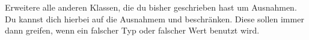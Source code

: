 \begin{aufg}
  Erweitere alle anderen Klassen, die du bisher geschrieben hast um Ausnahmen.
  Du kannst dich hierbei auf die Ausnahmem  und
   beschränken. Diese sollen immer dann greifen, wenn ein
  falscher Typ oder falscher Wert benutzt wird.
\end{aufg}

